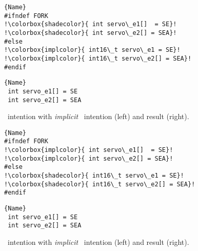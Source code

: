 \begin{figure}[ht]
    \centering
    \begin{minipage}{.35\textwidth}
\begin{lstlisting}[caption=Wrapped code by PC,escapechar=!]{Name}
#ifndef FORK
!\colorbox{shadecolor}{ int servo\_e1[]  = SE}!
!\colorbox{shadecolor}{ int servo\_e2[] = SEA}!
#else
!\colorbox{implcolor}{ int16\_t servo\_e1 = SE}!
!\colorbox{implcolor}{ int16\_t servo\_e2[] = SEA}!
#endif
\end{lstlisting}
\end{minipage}\qquad
\begin{minipage}{.35\textwidth}
\begin{lstlisting}[caption=Unwrapped code,escapechar=!]{Name}
 int servo_e1[] = SE
 int servo_e2[] = SEA
\end{lstlisting}
    \end{minipage}
    \caption{\colorbox{shadecolor}{\keep}~intention with \textit{implicit} \colorbox{implcolor}{\remove}~intention (left) and result (right).}
    \label{fig:keep-impl}
\end{figure}

\begin{figure}[ht]
    \centering
    \begin{minipage}{.35\textwidth}
\begin{lstlisting}[caption=Wrapped code by PC,escapechar=!]{Name}
#ifndef FORK
!\colorbox{implcolor}{ int servo\_e1[]  = SE}!
!\colorbox{implcolor}{ int servo\_e2[] = SEA}!
#else
!\colorbox{shadecolor}{ int16\_t servo\_e1 = SE}!
!\colorbox{shadecolor}{ int16\_t servo\_e2[] = SEA}!
#endif
\end{lstlisting}
\end{minipage}\qquad
\begin{minipage}{.35\textwidth}
\begin{lstlisting}[caption=Unwrapped code,escapechar=!]{Name}
 int servo_e1[] = SE
 int servo_e2[] = SEA
\end{lstlisting}
    \end{minipage}
    \caption{\colorbox{shadecolor}{\remove}~intention with \textit{implicit} \colorbox{implcolor}{\keep}~intention (left) and result (right).}
    \label{fig:remove-impl}
\end{figure}

